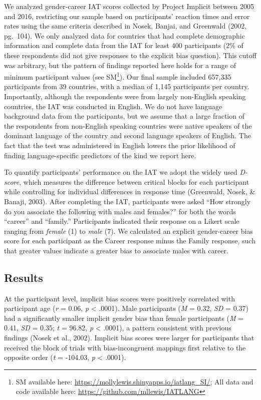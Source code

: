 \documentclass[9pt,twocolumn,twoside,lineno]{pnas-new}
\begin{document}
We analyzed gender-career IAT scores collected by Project Implicit
between 2005 and 2016, restricting our sample based on participants'
reaction times and error rates using the same criteria described in
Nosek, Banjai, and Greenwald (2002, pg.~104). We only analyzed data for
countries that had complete demographic information and complete data
from the IAT for least 400 participants (2\% of these respondents did
not give responses to the explicit bias question). This cutoff was
arbitrary, but the pattern of findings reported here holds for a range
of minimum participant values (see
SM\footnote{SM available here: \url{https://mollylewis.shinyapps.io/iatlang_SI/}; All data and code available here: \url{https://github.com/mllewis/IATLANG}}).
Our final sample included 657,335 participants from 39 countries, with a
median of 1,145 participants per country. Importantly, although the
respondents were from largely non-English speaking countries, the IAT
was conducted in English. We do not have language background data from
the participants, but we assume that a large fraction of the respondents
from non-English speaking countries were native speakers of the dominant
language of the country and second language speakers of English. The
fact that the test was administered in English lowers the prior
likelihood of finding language-specific predictors of the kind we report
here.

To quantify participants' performance on the IAT we adopt the widely
used \emph{D-score}, which measures the difference between critical
blocks for each participant while controlling for individual differences
in response time (Greenwald, Nosek, \& Banaji, 2003). After completing
the IAT, participants were asked \enquote{How strongly do you associate
the following with males and females?} for both the words
\enquote{career} and \enquote{family.} Participants indicated their
response on a Likert scale ranging from \emph{female} (1) to \emph{male}
(7). We calculated an explicit gender-career bias score for each
participant as the Career response minus the Family response, such that
greater values indicate a greater bias to associate males with career.

\subsection*{Results}\label{results}

At the participant level, implicit bias scores were positively
correlated with participant age (\emph{r} = 0.06, \emph{p} \textless{}
.0001). Male participants (\emph{M} = 0.32, \emph{SD} = 0.37) had a
significantly smaller implicit gender bias than female participants
(\emph{M} = 0.41, \emph{SD} = 0.35; \emph{t} = 96.82, \emph{p}
\textless{} .0001), a pattern consistent with previous findings (Nosek
et al., 2002). Implicit bias scores were larger for participants that
received the block of trials with bias-incongruent mappings first
relative to the opposite order (\emph{t} = -104.03, \emph{p} \textless{}
.0001).
\end{document}
